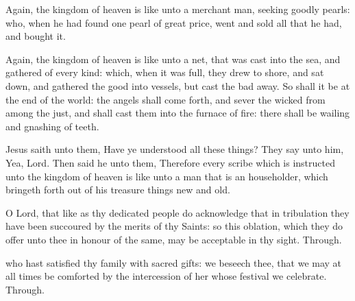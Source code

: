 Again, the kingdom of heaven is like unto a merchant man, seeking goodly pearls: who, when he had found one pearl of great price, went and sold all that he had, and bought it.

Again, the kingdom of heaven is like unto a net, that was cast into the sea, and gathered of every kind: which, when it was full, they drew to shore, and sat down, and gathered the good into vessels, but cast the bad away. So shall it be at the end of the world: the angels shall come forth, and sever the wicked from among the just, and shall cast them into the furnace of fire: there shall be wailing and gnashing of teeth.

Jesus saith unto them, Have ye understood all these things? They say unto him, Yea, Lord. Then said he unto them, Therefore every scribe which is instructed unto the kingdom of heaven is like unto a man that is an householder, which bringeth forth out of his treasure things new and old.


\secret
{} O Lord, that like as thy dedicated people do acknowledge that in tribulation they have been succoured by the merits of thy Saints: so this oblation, which they do offer unto thee in honour of the same, may be acceptable in thy sight. Through.


\postcommunion
{} who hast satisfied thy family with sacred gifts: we beseech thee, that we may at all times be comforted by the intercession of her whose festival we celebrate. Through.


